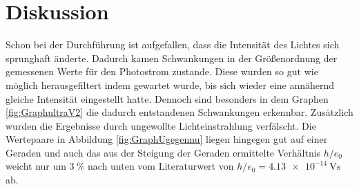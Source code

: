 
\section{Diskussion}
\label{sec:Diskussion}

Schon bei der Durchführung ist aufgefallen, dass die Intensität des Lichtes sich sprunghaft änderte. Dadurch kamen Schwankungen in der Größenordnung der gemessenen Werte für den Photostrom zustande. Diese wurden so gut wie möglich herausgefiltert indem gewartet wurde, bis sich wieder eine annähernd gleiche Intensität eingestellt hatte. Dennoch sind besonders in dem Graphen \ref{fig:GraphultraV2} die dadurch entstandenen Schwankungen erkennbar. Zusätzlich wurden die Ergebnisse durch ungewollte Lichteinstrahlung verfälscht. Die Wertepaare in Abbildung \ref{fig:GraphUgegennu} liegen hingegen gut auf einer Geraden und auch das aus der Steigung der Geraden ermittelte Verhältnis $h/e_0$ weicht nur um $\SI{3}{\percent}$ nach unten vom Literaturwert von $h/e_0=\SI{4.13e-14}{\volt\second}$ \cite{nistgov} ab.
